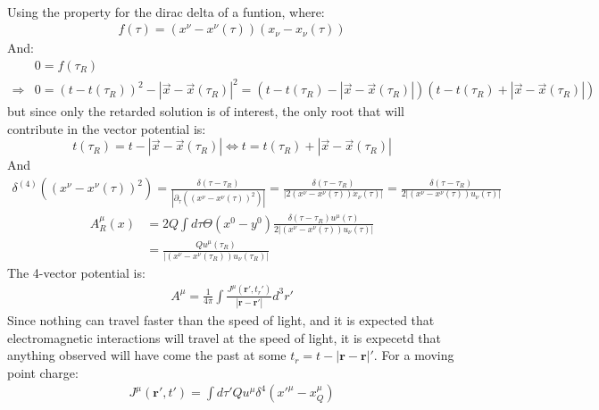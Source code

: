 \documentclass[12pt,a4]{article}
\begin{document}
\begin{enumerate}
\begin{enumerate}
\begin{align*}
        \end{align*}
        Using the property for the dirac delta of a funtion, where:
        \begin{align*}
          f(\tau) = (x^\nu - x^{\nu}(\tau))(x_\nu - x_{\nu}(\tau)) 
        \end{align*}
        And:
        \begin{align*}
          &0 = f(\tau_R)\\ 
          \Rightarrow &0 = (t - t(\tau_R))^2 - |\vec{x} - \vec{x}(\tau_R)|^2 = (t - t(\tau_R) - |\vec{x} - \vec{x}(\tau_R)|) (t - t(\tau_R) + |\vec{x} - \vec{x}(\tau_R)|)
        \end{align*}
        but since only the retarded solution is of interest, the only root that will contribute in the vector potential is:
        \begin{equation*}
          t(\tau_R) = t  - |\vec{x} - \vec{x}(\tau_R)| \Leftrightarrow t = t(\tau_R) + |\vec{x} - \vec{x}(\tau_R)|
        \end{equation*}
        And
        \begin{align*}
          \delta^{(4)}\left((x^\nu - x^{\nu}(\tau))^2\right) = \frac{\delta(\tau - \tau_R)}{\left|\partial_\tau\left((x^\nu - x^{\nu}(\tau))^2\right)\right|} = \frac{\delta(\tau - \tau_R)}{\left|2(x^\nu - x^{\nu}(\tau))\dot{x}_{\nu}(\tau)\right|} = \frac{\delta(\tau - \tau_R)}{2\left|(x^\nu - x^{\nu}(\tau))u_{\nu}(\tau)\right|}
        \end{align*}
        \begin{align*}
          A^\mu_R(x) &= 2 Q \int d\tau \Theta(x^{0} - y^{0})\frac{\delta(\tau - \tau_R) u^\mu(\tau)}{2\left|(x^\nu - x^{\nu}(\tau))u_{\nu}(\tau)\right|} \\
                     &= \frac{Qu^\mu(\tau_R)}{\left|(x^\nu - x^{\nu}(\tau_R))u_{\nu}(\tau_R)\right|} 
        \end{align*}
        The 4-vector potential is:
        \begin{gather*}
          A^\mu = \frac{1}{4 \pi}\int \frac{J^\mu (\mathbf{r}', t_r')}{|\mathbf{r} - \mathbf{r}'|} d^3r'
        \end{gather*}
        Since nothing can travel faster than the speed of light, and it is expected that electromagnetic interactions will travel at the speed of light, it is expecetd that anything observed will have come the past at some $t_r = t - |\mathbf{r} - \mathbf{r}|'$.
        For a moving point charge:
        \begin{gather*}
          J^\mu (\mathbf{r}', t') = \int d\tau' Q u^\mu \delta^4(x'^\mu - x_Q^\mu)

\end{gather*}
\end{enumerate}
\end{enumerate}
\end{document}
